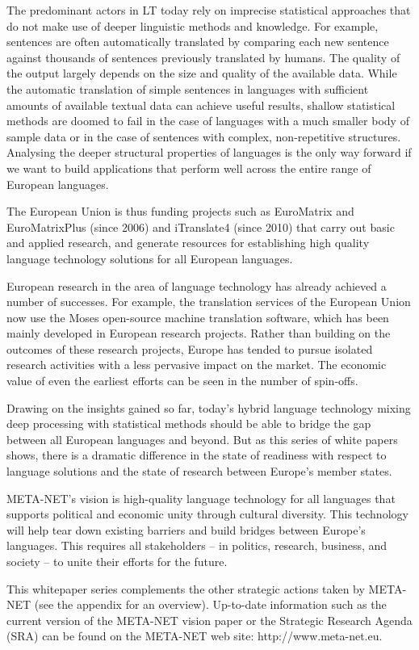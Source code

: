 \documentclass[]{../../metanetpaper}
\begin{document}
\begin{multicols}{2}

The predominant actors in LT today rely on imprecise statistical approaches that do not make use of deeper linguistic methods and knowledge. For example, sentences are often automatically translated by comparing each new sentence against thousands of sentences previously translated by humans. The quality of the output largely depends on the size and quality of the available  data. While the automatic translation of simple sentences in languages with sufficient amounts of available textual data can achieve useful results, shallow statistical methods are doomed to fail in the case of languages with a much smaller body of sample data or in the case of sentences with complex, non-repetitive structures. Analysing the deeper structural properties of languages is the only way forward if we want to build applications that perform well across the entire range of European languages.

The European Union is thus funding projects such as EuroMatrix and EuroMatrixPlus (since 2006) and iTranslate4 (since 2010) that carry out basic and applied research, and generate resources for establishing high quality language technology solutions for all European languages. 

European research in the area of language technology has already achieved a number of successes. For example, the translation services of the European Union now use the Moses open-source machine translation software, which has been mainly developed in European research projects. Rather than building on the outcomes of these research projects, Europe has tended to pursue isolated research activities with a less pervasive impact on the market. The economic value of even the earliest efforts can be seen in the number of spin-offs. 


Drawing on the insights gained so far, today’s hybrid language technology mixing deep processing with statistical methods should be able to bridge the gap between all European languages and beyond. But as this series of white papers shows, there is a dramatic difference in the state of readiness with respect to language solutions and the state of research between Europe’s member states.  

META-NET’s vision is high-quality language technology for all languages that supports political and economic unity through cultural diversity. This technology will help tear down existing barriers and build bridges between Europe’s languages. This requires all stakeholders -- in politics, research, business, and society -- to unite their efforts for the future.

This whitepaper series complements the other strategic actions taken by META-NET (see the appendix for an overview). Up-to-date information such as the current version of the META-NET vision paper \cite{Meta1} or the Strategic Research Agenda (SRA) can be found on the META-NET web site: http://www.meta-net.eu.
\end{multicols}
\end{document}
